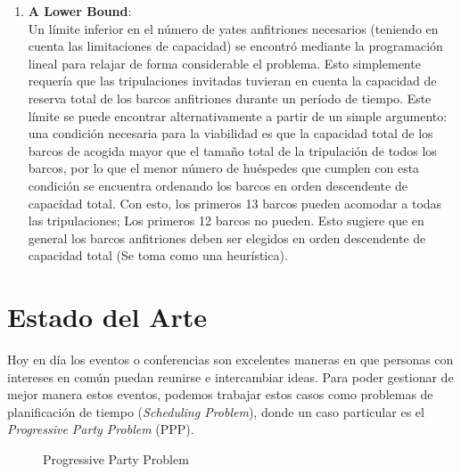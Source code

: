 \documentclass[letter, 10pt]{article}
\begin{document}
\begin{enumerate}
    \item \textbf{A Lower Bound}: \\ 
    Un límite inferior en el número de yates anfitriones necesarios (teniendo en cuenta las limitaciones de capacidad) se encontró mediante la programación lineal para relajar de forma considerable el problema. Esto simplemente requería que las tripulaciones invitadas tuvieran en cuenta la capacidad de reserva total de los barcos anfitriones durante un período de tiempo. Este límite se puede encontrar alternativamente a partir de un simple argumento: una condición necesaria para la viabilidad es que la capacidad total de los barcos de acogida mayor que el tamaño total de la tripulación de todos los barcos, por lo que el menor número de huéspedes que cumplen con esta condición se encuentra ordenando los barcos en orden descendente de capacidad total. Con esto, los primeros 13 barcos pueden acomodar a todas las tripulaciones; Los primeros 12 barcos no pueden. Esto sugiere que en general los barcos anfitriones deben ser elegidos en orden descendente de capacidad total (Se toma como una heurística).~\cite{Smith1996}

\end{enumerate}

\section{Estado del Arte}
Hoy en día los eventos o conferencias son excelentes maneras en que personas con intereses en común puedan reunirse e intercambiar ideas. Para poder gestionar de mejor manera estos eventos, podemos trabajar estos casos como problemas de planificación de tiempo (\textit{Scheduling Problem}), donde un caso particular es el \textit{Progressive Party Problem} (PPP). 

\begin{figure}[ht]
 \centering
 \caption{Progressive Party Problem}
 \label{f:PPP}
\end{figure}
\end{document}
